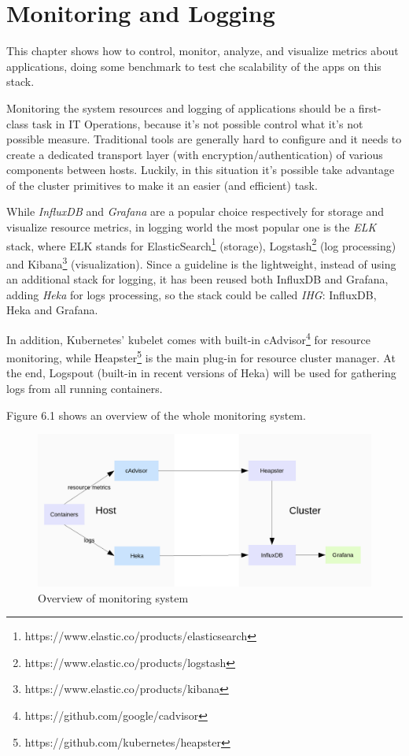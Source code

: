 \chapter{Monitoring and Logging}\label{monitoring-and-logging}

This chapter shows how to control, monitor, analyze, and visualize
metrics about applications, doing some benchmark to test che scalability
of the apps on this stack.

Monitoring the system resources and logging of applications should be a
first-class task in IT Operations, because it's not possible control
what it's not possible measure. Traditional tools are generally hard to
configure and it needs to create a dedicated transport layer (with
encryption/authentication) of various components between hosts. Luckily,
in this situation it's possible take advantage of the cluster primitives
to make it an easier (and efficient) task.

While \textit{InfluxDB} and \textit{Grafana} are a popular choice
respectively for storage and visualize resource metrics, in logging
world the most popular one is the \textit{ELK} stack, where ELK stands for
ElasticSearch\footnote{https://www.elastic.co/products/elasticsearch} (storage), Logstash\footnote{https://www.elastic.co/products/logstash} (log processing) and
Kibana\footnote{https://www.elastic.co/products/kibana} (visualization). Since a guideline is the lightweight,
instead of using an additional stack for logging, it has been reused
both InfluxDB and Grafana, adding \textit{Heka} for logs processing, so
the stack could be called \textit{IHG}: InfluxDB, Heka and Grafana.

In addition, Kubernetes' kubelet comes with built-in cAdvisor\footnote{https://github.com/google/cadvisor} for
resource monitoring, while Heapster\footnote{https://github.com/kubernetes/heapster} is the main plug-in for
resource cluster manager. At the end, Logspout (built-in in recent
versions of Heka) will be used for gathering logs from all running
containers.

Figure 6.1 shows an overview of the whole monitoring system.

\begin{figure}[htbp]
\centering
\includegraphics{media/ch6-overview.png}
\caption{Overview of monitoring system}
\end{figure}

